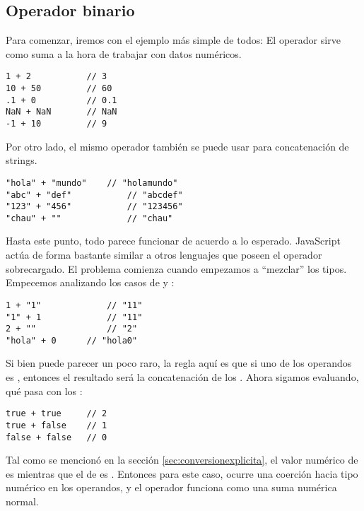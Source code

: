 \subsection{Operador binario}

Para comenzar, iremos con el ejemplo más simple de todos: El operador \code{+} sirve como suma a la hora de trabajar con datos numéricos.

\begin{lstlisting}[title={Operador \code{+} en números}]
1 + 2 			// 3
10 + 50 		// 60
.1 + 0			// 0.1
NaN + NaN		// NaN
-1 + 10			// 9
\end{lstlisting}

Por otro lado, el mismo operador también se puede usar para concatenación de strings.

\begin{lstlisting}[title={Operador \code{+} en strings}]
"hola" + "mundo"	// "holamundo"
"abc" + "def"			// "abcdef"
"123" + "456"			// "123456"
"chau" + ""				// "chau"
\end{lstlisting}

Hasta este punto, todo parece funcionar de acuerdo a lo esperado. JavaScript actúa de forma bastante similar a otros lenguajes que poseen el operador \code{+} sobrecargado. El problema comienza cuando empezamos a "`mezclar"' los tipos. Empecemos analizando los casos de  y :

\begin{lstlisting}[title={Operador \code{+} mezclando strings con números}]
1 + "1"				// "11"
"1" + 1				// "11"
2 + ""				// "2"
"hola" + 0		// "hola0"
\end{lstlisting}

Si bien puede parecer un poco raro, la regla aquí es que si uno de los operandos es , entonces el resultado será la concatenación de los . Ahora sigamos evaluando, qué pasa con los :

\begin{lstlisting}[title={Operador \code{+} en booleanos}]
true + true		// 2
true + false	// 1
false + false	// 0
\end{lstlisting}

Tal como se mencionó en la sección \ref{sec:conversionexplicita}, el valor numérico de  es  mientras que el de  es . Entonces para este caso, ocurre una coerción hacia tipo numérico en los operandos, y el operador \code{+} funciona como una suma numérica normal.

